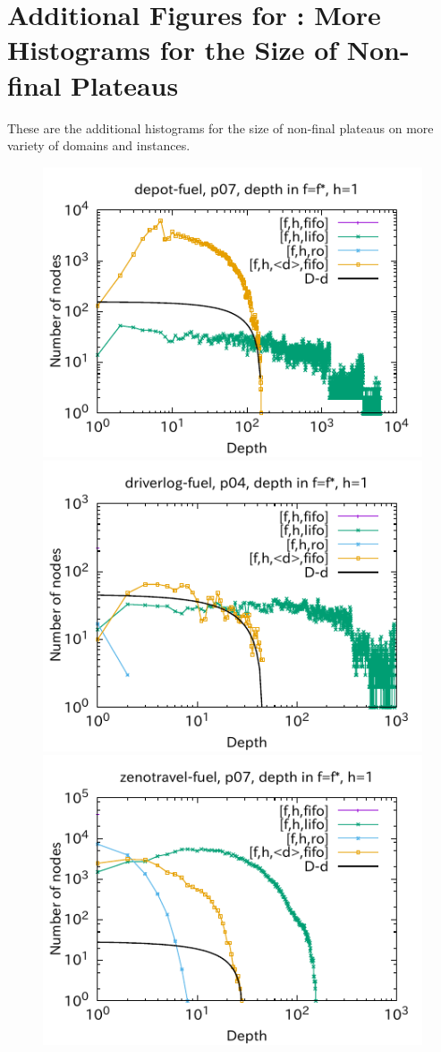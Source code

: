 \clearpage
\section{Additional Figures for : More Histograms for the Size of Non-final Plateaus}

These are the additional histograms for the size of non-final plateaus on
more variety of domains and instances.

\begin{figure}[htbp]
\includegraphics{img/output-lmcut/depot-fuel/p07-1.pdf}
\includegraphics{img/output-lmcut/driverlog-fuel/p04-1.pdf}
\includegraphics{img/output-lmcut/zenotravel-fuel/p07-1.pdf}

\end{figure}
